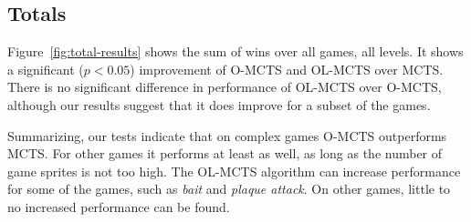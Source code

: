 \subsection{Totals}
\label{subsec:totals}
Figure~\ref{fig:total-results} shows the sum of wins over all games, all levels.
It shows a significant ($p < 0.05$) improvement of O-MCTS and OL-MCTS over
MCTS\@.  There is no significant difference in performance of OL-MCTS over
O-MCTS, although our results suggest that it does improve for a subset of the
games.

Summarizing, our tests indicate that on complex games O-MCTS outperforms MCTS\@.
For other games it performs at least as well, as long as the number of game
sprites is not too high.  The OL-MCTS algorithm can increase performance for
some of the games, such as \textit{bait} and \textit{plaque attack}. On other
games, little to no increased performance can be found.
